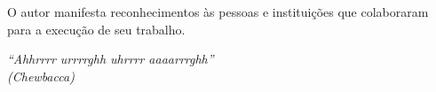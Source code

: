 \documentclass[
	12pt,				%
	openright,			%
	oneside,			%
	a4paper,			%
	sumario=tradicional,%
	french,				%
	spanish,			%
	brazil,				%
    english
	]{abntex2}
\begin{document}
\begin{agradecimentos}
O autor manifesta reconhecimentos às pessoas e instituições que colaboraram para a execução de seu trabalho.

\end{agradecimentos}

\begin{epigrafe}
    \vspace*{\fill}
	\begin{flushright}
		\textit{``Ahhrrrr urrrrghh uhrrrr aaaarrrghh''\\
		(Chewbacca)}
	\end{flushright}
\end{epigrafe}

\end{document}
